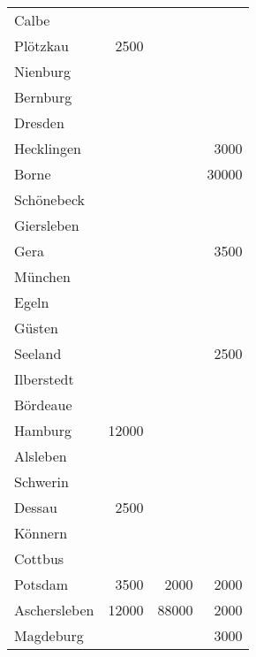           \begin{center}
            \begin{small}
              \tablehead{}
              \begin{oraclesql}
                \begin{supertabular}{lrrr}
                  Calbe &  &  &  \\
                  Pl\"otzkau & 2500 &  &  \\
                  Nienburg &  &  &  \\
                  Bernburg &  &  &  \\
                  Dresden &  &  &  \\
                  Hecklingen &  &  & 3000 \\
                  Borne &  &  & 30000 \\
                  Sch\"onebeck &  &  &  \\
                  Giersleben &  &  &  \\
                  Gera &  &  & 3500 \\
                  M\"unchen &  &  &  \\
                  Egeln &  &  &  \\
                  G\"usten &  &  &  \\
                  Seeland &  &  & 2500 \\
                  Ilberstedt &  &  &  \\
                  B\"ordeaue &  &  &  \\
                  Hamburg & 12000 &  &  \\
                  Alsleben &  &  &  \\
                  Schwerin &  &  &  \\
                  Dessau & 2500 &  &  \\
                  K\"onnern &  &  &  \\
                  Cottbus &  &  &  \\
                  Potsdam & 3500 & 2000 & 2000 \\
                  Aschersleben & 12000 & 88000 & 2000 \\
                  Magdeburg &  &  & 3000 \\
                \end{supertabular}
              \end{oraclesql}
            \end{small}
          \end{center}
